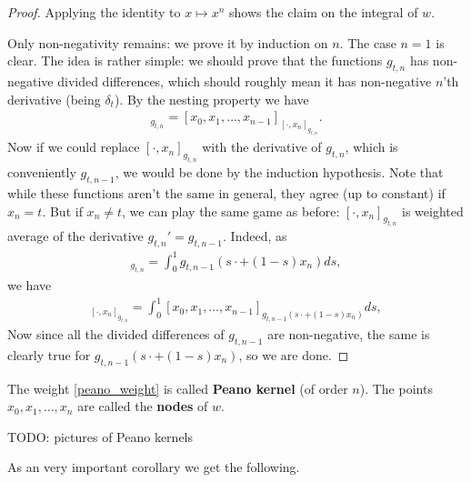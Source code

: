 \begin{proof}
	Applying the identity to $x \mapsto x^{n}$ shows the claim on the integral of $w$.

	Only non-negativity remains: we prove it by induction on $n$. The case $n = 1$ is clear. The idea is rather simple: we should prove that the functions $g_{t, n}$ has non-negative divided differences, which should roughly mean it has non-negative $n$'th derivative (being $\delta_{t}$). By the nesting property we have
	\begin{align*}
		[x_{0}, x_{1}, \ldots, x_{n}]_{g_{t, n}} = [x_{0}, x_{1}, \ldots, x_{n - 1}]_{[\cdot, x_{n}]_{g_{t, n}}}.
	\end{align*}
	Now if we could replace $[\cdot, x_{n}]_{g_{t, n}}$ with the derivative of $g_{t, n}$, which is conveniently $g_{t, n - 1}$, we would be done by the induction hypothesis. Note that while these functions aren't the same in general, they agree (up to constant) if $x_{n} = t$. But if $x_{n} \neq t$, we can play the same game as before: $[\cdot, x_{n}]_{g_{t, n}}$ is weighted average of the derivative $g_{t, n}' = g_{t, n - 1}$. Indeed, as
	\begin{align*}
		[\cdot, x_{n}]_{g_{t, n}} = \int_{0}^{1} g_{t, n - 1}(s \cdot + (1 - s) x_{n}) ds,
	\end{align*}
	we have
	\begin{align*}
		[x_{0}, x_{1}, \ldots, x_{n}]_{[\cdot, x_{n}]_{g_{t, n}}} = \int_{0}^{1} [x_{0}, x_{1}, \ldots, x_{n - 1}]_{g_{t, n - 1}(s \cdot + (1 - s) x_{n})} ds,
	\end{align*}
	Now since all the divided differences of $g_{t, n - 1}$ are non-negative, the same is clearly true for $g_{t, n - 1}(s \cdot + (1 - s) x_{n})$, so we are done.
\end{proof}

The weight \ref{peano_weight} is called \textbf{Peano kernel} (of order $n$). The points $x_{0}, x_{1}, \ldots, x_{n}$ are called the \textbf{nodes} of $w$.

TODO: pictures of Peano kernels

As an very important corollary we get the following.

